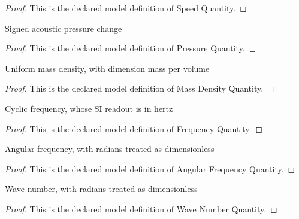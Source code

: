 \begin{proof}
  This is the declared model definition of Speed Quantity.
\end{proof}
\begin{definition}
  \label{def:physics:phyx-mini-0309:phyxminiproblems-problemphyxmini0309-pressurequantity}
  Signed acoustic pressure change
\end{definition}
\begin{proof}
  This is the declared model definition of Pressure Quantity.
\end{proof}
\begin{definition}
  \label{def:physics:phyx-mini-0309:phyxminiproblems-problemphyxmini0309-massdensityquantity}
  Uniform mass density, with dimension mass per volume
\end{definition}
\begin{proof}
  This is the declared model definition of Mass Density Quantity.
\end{proof}
\begin{definition}
  \label{def:physics:phyx-mini-0309:phyxminiproblems-problemphyxmini0309-frequencyquantity}
  Cyclic frequency, whose SI readout is in hertz
\end{definition}
\begin{proof}
  This is the declared model definition of Frequency Quantity.
\end{proof}
\begin{definition}
  \label{def:physics:phyx-mini-0309:phyxminiproblems-problemphyxmini0309-angularfrequencyquantity}
  Angular frequency, with radians treated as dimensionless
\end{definition}
\begin{proof}
  This is the declared model definition of Angular Frequency Quantity.
\end{proof}
\begin{definition}
  \label{def:physics:phyx-mini-0309:phyxminiproblems-problemphyxmini0309-wavenumberquantity}
  Wave number, with radians treated as dimensionless
\end{definition}
\begin{proof}
  This is the declared model definition of Wave Number Quantity.
\end{proof}
